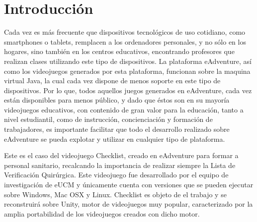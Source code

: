 
\cleardoublepage


\chapter{Introducción}
\label{makereference}

Cada vez es más frecuente que dispositivos tecnológicos de uso cotidiano, como smartphones o tablets, remplacen a los ordenadores personales, y no sólo en los hogares, sino también en los centros educativos, encontrando profesores que realizan clases utilizando este tipo de dispositivos. La plataforma eAdventure, así como los videojuegos generados por esta plataforma, funcionan sobre la maquina virtual Java, la cual cada vez dispone de menos soporte en este tipo de dispositivos. Por lo que, todos aquellos juegos generados en eAdventure, cada vez están disponibles para menos público, y dado que éstos son en su mayoría videojuegos educativos, con contenido de gran valor para la educación, tanto a nivel estudiantil, como de instrucción, concienciación y formación de trabajadores, es importante facilitar que todo el desarrollo realizado sobre eAdventure se pueda explotar y utilizar en cualquier tipo de plataforma.

Este es el caso del videojuego Checklist, creado en eAdventure para formar a personal sanitario, recalcando la importancia de realizar siempre la Lista de Verificación Quirúrgica. Este videojuego fue desarrollado por el equipo de investigación de eUCM y únicamente cuenta con versiones que se pueden ejecutar sobre Windows, Mac OSX y Linux. Checklist es objeto de el trabajo y se reconstruirá sobre Unity, motor de videojuegos muy popular, caracterizado por la amplia portabilidad de los videojuegos creados con dicho motor.

